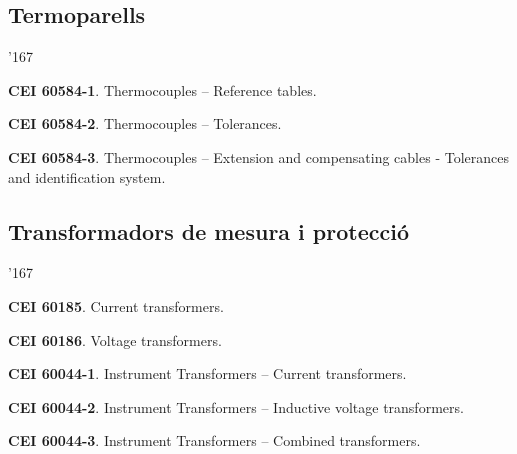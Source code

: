 \subsection*{Termoparells} 
\begin{dinglist}{'167}
    \item \textbf{CEI 60584-1}. Thermocouples -- Reference tables.
    \item \textbf{CEI 60584-2}. Thermocouples -- Tolerances.
    \item \textbf{CEI 60584-3}. Thermocouples -- Extension and compensating cables - Tolerances and identification system.
\end{dinglist}


\subsection*{Transformadors de mesura i protecci\'{o}}
\begin{dinglist}{'167}
    \item \textbf{CEI 60185}. Current transformers.
    \item \textbf{CEI 60186}. Voltage transformers.
    \item \textbf{CEI 60044-1}. Instrument Transformers -- Current transformers.
    \item \textbf{CEI 60044-2}. Instrument Transformers -- Inductive voltage transformers.
    \item \textbf{CEI 60044-3}. Instrument Transformers -- Combined transformers.
\end{dinglist}


